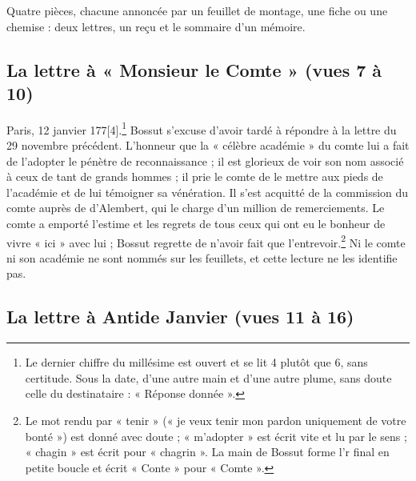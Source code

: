 \documentclass[11pt,a4paper]{article}
\begin{document}
Quatre pièces, chacune annoncée par un feuillet de montage, une fiche ou une
chemise : deux lettres, un reçu et le sommaire d'un mémoire.

\subsection*{La lettre à « Monsieur le Comte » (vues 7 à 10)}

Paris, 12 janvier 177[4].\footnote{Le dernier chiffre du millésime est ouvert
et se lit 4 plutôt que 6, sans certitude. Sous la date, d'une autre main et
d'une autre plume, sans doute celle du destinataire : « Réponse donnée ».}
Bossut s'excuse d'avoir tardé à répondre à la lettre du 29 novembre
précédent. L'honneur que la « célèbre académie » du comte lui a fait de
l'adopter le pénètre de reconnaissance ; il est glorieux de voir son nom
associé à ceux de tant de grands hommes ; il prie le comte de le mettre aux
pieds de l'académie et de lui témoigner sa vénération. Il s'est acquitté de la
commission du comte auprès de d'Alembert, qui le charge d'un million de
remerciements. Le comte a emporté l'estime et les regrets de tous ceux qui ont
eu le bonheur de vivre « ici » avec lui ; Bossut regrette de n'avoir fait que
l'entrevoir.\footnote{Le mot rendu par « tenir » (« je veux tenir mon pardon
uniquement de votre bonté ») est donné avec doute ; « m'adopter » est écrit
vite et lu par le sens ; « chagin » est écrit pour « chagrin ». La main de
Bossut forme l'r final en petite boucle et écrit « Conte » pour « Comte ».}
Ni le comte ni son académie ne sont nommés sur les feuillets, et cette lecture
ne les identifie pas.

\subsection*{La lettre à Antide Janvier (vues 11 à 16)}
\end{document}
